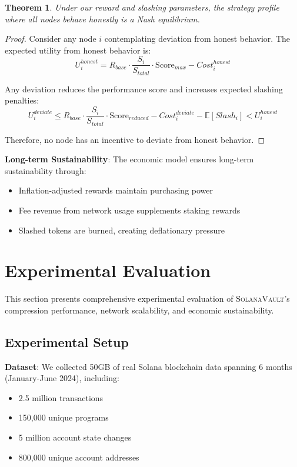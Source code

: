 \documentclass[11pt,a4paper]{article}
\newcommand{\SolanaVault}{\textsc{SolanaVault}}
\newtheorem{theorem}{Theorem}
\begin{document}
\begin{theorem}
Under our reward and slashing parameters, the strategy profile where all nodes behave honestly is a Nash equilibrium.
\end{theorem}

\begin{proof}
Consider any node $i$ contemplating deviation from honest behavior. The expected utility from honest behavior is:
\begin{equation}
U_i^{honest} = R_{base} \cdot \frac{S_i}{S_{total}} \cdot \text{Score}_{max} - Cost_i^{honest}
\end{equation}

Any deviation reduces the performance score and increases expected slashing penalties:
\begin{equation}
U_i^{deviate} \leq R_{base} \cdot \frac{S_i}{S_{total}} \cdot \text{Score}_{reduced} - Cost_i^{deviate} - \mathbb{E}[Slash_i] < U_i^{honest}
\end{equation}

Therefore, no node has an incentive to deviate from honest behavior.
\end{proof}

\textbf{Long-term Sustainability}: The economic model ensures long-term sustainability through:
\begin{itemize}
\item Inflation-adjusted rewards maintain purchasing power
\item Fee revenue from network usage supplements staking rewards
\item Slashed tokens are burned, creating deflationary pressure
\end{itemize}

\section{Experimental Evaluation}
\label{sec:evaluation}

This section presents comprehensive experimental evaluation of \SolanaVault's compression performance, network scalability, and economic sustainability.

\subsection{Experimental Setup}

\textbf{Dataset}: We collected 50GB of real Solana blockchain data spanning 6 months (January-June 2024), including:
\begin{itemize}
\item 2.5 million transactions
\item 150,000 unique programs
\item 5 million account state changes
\item 800,000 unique account addresses
\end{itemize}
\end{document}
